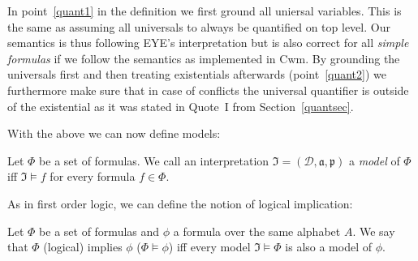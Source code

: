 \begin{definition}
\end{definition}

In point~\ref{quant1} in the definition we first ground all uniersal variables. This is the same as assuming all universals to always be quantified on top level. Our semantics is thus following 
EYE's interpretation but is also correct for all \emph{simple formulas} if we follow the semantics as implemented in Cwm.
By grounding the universals first and then treating existentials afterwards (point~\ref{quant2}) we furthermore make sure 
that in case of conflicts the universal quantifier is outside of the existential as it was stated in Quote~I from Section~\ref{quantsec}.


With the above we can now define models:

\begin{definition}[Model]
Let $\Phi$ be a set of \nthree formulas. We call an interpretation $\mathfrak{I}=(\mathcal{D},\mathfrak{a,p})$ a \textit{model} of $\Phi$ iff $\mathfrak{I}\models f$ for every formula $f\in \Phi$.
\end{definition}
%
As in first order logic, we can define the notion of logical implication:

\begin{definition}\label{log_impl}
Let $\Phi$ be a set of \nthree formulas  and $\phi$ a formula over the same \nthree alphabet $A$. We say that $\Phi$ (logical) implies 
$\phi$ ($\Phi \models \phi$) iff every
model $\mathfrak{I}\models \Phi$ is also a model of $\phi$.
\end{definition}




